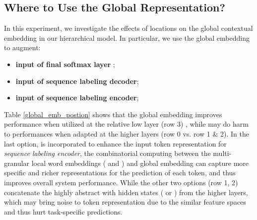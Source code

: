 \documentclass[11pt,a4paper]{article}
\begin{document}
\subsection{Where to Use the Global Representation?} \label{section_global_position}
In this experiment, we investigate the effects of locations on the global contextual embedding in our hierarchical model. In particular, we use the global embedding  to augment:

\begin{itemize}
\item \textbf{input of final softmax layer }; \\ 
\item \textbf{input of sequence labeling decoder}; \\ 

\item \textbf{input of sequence labeling encoder}; \\

\end{itemize}

\begin{table}[t!]
\begin{center}
\end{center}
\caption{Comparison of CoNLL03 test   when the global contextual embedding is used at different layers.}
\label{global_emb_postion}
\end{table}

Table \ref{global_emb_postion} shows that the global embedding  improves performance when utilized at the relative low layer (row 3) , while  may do harm to performances when adapted at the higher layers (row 0 vs. row 1 \& 2). In the last option,  is incorporated to enhance the input token representation for \emph{sequence labeling encoder}, the combinatorial computing between the multi-granular local word embeddings ( and ) and global embedding  can capture more specific and richer representations for the prediction of each token, and thus improves overall system performance. While the other two options (row 1, 2) concatenate the highly abstract  with hidden states ( or ) from the higher layers, which may bring noise to token representation due to the similar feature spaces and thus hurt task-specific predictions.
\end{document}
